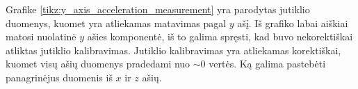 Grafike \ref{tikz:y_axis_acceleration_measurement} yra parodytas jutiklio duomenys, kuomet yra atliekamas matavimas pagal $y$ ašį.
Iš grafiko labai aiškiai matosi nuolatinė $y$ ašies komponentė, iš to galima spręsti, kad buvo nekorektiškai atliktas jutiklio kalibravimas.
Jutiklio kalibravimas yra atliekamas korektiškai, kuomet visų ašių duomenys pradedami nuo $\sim 0$ vertės.
Ką galima pastebėti panagrinėjus duomenis iš $x$ ir $z$ ašių.



